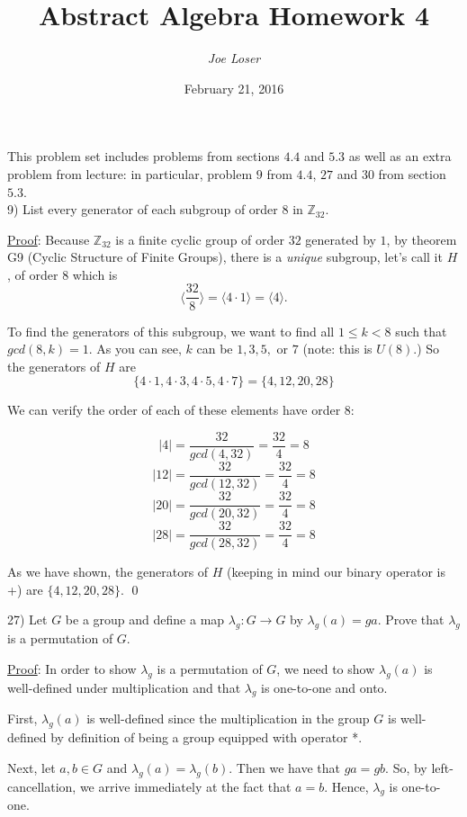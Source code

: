 \documentclass{article}
\title{Abstract Algebra Homework 4}
\author{\textit{Joe Loser}}
\date{February 21, 2016}
\begin{document}
\maketitle

This problem set includes problems from sections $4.4$ and $5.3$ as well as an extra problem from lecture: in particular, problem $9$ from $4.4$, $27$ and $30$ from section $5.3$. \\

9) List every generator of each subgroup of order $8$ in $\mathbb{Z}_{32}.$

\underline{Proof}: Because $\mathbb{Z}_{32}$ is a finite cyclic group of order $32$ generated by $1$, by theorem G9 (Cyclic Structure of Finite Groups), there is a \textit{unique} subgroup, let's call it $H$, of order $8$ which is 
$$ \Bigg \langle \frac{32}{8} \Bigg \rangle = \Bigg \langle 4 \cdot 1 \Bigg \rangle = \Bigg \langle 4 \Bigg \rangle. $$

To find the generators of this subgroup, we want to find all $1 \le k < 8$ such that $gcd(8, k) = 1.$ As you can see, $k$ can be $1, 3, 5,$ or $7$ (note: this is $U(8)$.) So the generators of $H$ are
$$ \{ 4 \cdot 1, 4 \cdot 3, 4 \cdot 5, 4 \cdot 7 \} = \{4, 12, 20, 28\} $$

We can verify the order of each of these elements have order $8$:

$$ \lvert 4 \rvert = \frac{32}{gcd(4, 32)} = \frac{32}{4} = 8 $$
$$ \lvert 12 \rvert = \frac{32}{gcd(12, 32)} = \frac{32}{4} = 8 $$
$$ \lvert 20 \rvert = \frac{32}{gcd(20, 32)} = \frac{32}{4} = 8 $$
$$ \lvert 28 \rvert = \frac{32}{gcd(28, 32)} = \frac{32}{4} = 8 $$

As we have shown, the generators of $H$ (keeping in mind our binary operator is +) are $\{4, 12, 20, 28\}.$ \qed \\ \newpage

27) Let $G$ be a group and define a map $\lambda _g : G \to G$ by $\lambda _g(a) = ga.$ Prove that $\lambda _g$ is a permutation of $G.$ 

\underline{Proof}: In order to show $\lambda _g$ is a permutation of $G$, we need to show $\lambda _g(a)$ is well-defined under multiplication and that $\lambda _g$ is one-to-one and onto.

First, $\lambda _g(a)$ is well-defined since the multiplication in the group $G$ is well-defined by definition of being a group equipped with operator *.

Next, let $a, b \in G$ and $\lambda _g(a) = \lambda_g(b).$ Then we have that $ga = gb$. So, by left-cancellation, we arrive immediately at the fact that $a = b$. Hence, $\lambda _g$ is one-to-one.
\end{document}
